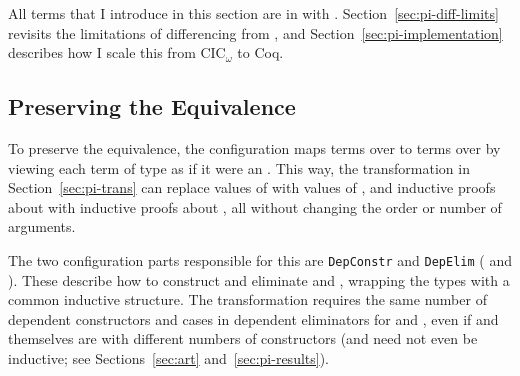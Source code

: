 All terms that I introduce in this section are in  with . %
Section~\ref{sec:pi-diff-limits} revisits the limitations of differencing from \sysname, 
and Section~\ref{sec:pi-implementation} describes how I scale this from CIC$_{\omega}$ to Coq.

\subsection{Preserving the Equivalence}
\label{sec:pi-diff-equiv}

To preserve the equivalence, the configuration maps terms over \Aa to terms over \B by viewing each
term of type \B as if it were an \Aa.
This way, the transformation in Section~\ref{sec:pi-trans} can replace values of \Aa with values of \B, and
inductive proofs about \Aa with inductive proofs about \B, %
all without changing the order or number of arguments.

The two configuration parts responsible for this are \lstinline{DepConstr}
and \lstinline{DepElim} ( and ).
These describe how to construct and eliminate \Aa and \B, wrapping the types with a common inductive structure.
The transformation requires the same number of dependent constructors and cases in dependent eliminators for \Aa and \B,
even if \Aa and \B themselves are  with different numbers of constructors
(\Aa and \B need not even be inductive; see Sections~\ref{sec:art} and~\ref{sec:pi-results}).

